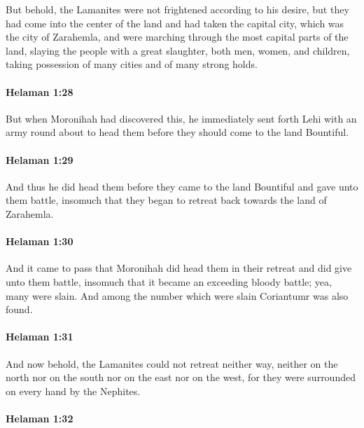 			But behold, the Lamanites were not frightened according to his desire,
			but they had come into the center of the land
			and had taken the capital city, which was the city of Zarahemla,
			and were marching through the most capital parts of the land,
			slaying the people with a great slaughter,
			both men, women, and children,
			taking possession of many cities and of many strong holds.

		\paragraph{Helaman 1:28} %
			\label{HELAMAN-1-28}

			But when Moronihah had discovered this,
			he immediately sent forth Lehi with an army round about to head them
			before they should come to the land Bountiful.

		\paragraph{Helaman 1:29} %
			\label{HELAMAN-1-29}

			And thus he did head them before they came to the land Bountiful
			and gave unto them battle,
			insomuch that they began to retreat back towards the land of Zarahemla.

		\paragraph{Helaman 1:30} %
			\label{HELAMAN-1-30}

			And it came to pass that Moronihah did head them in their retreat
			and did give unto them battle,
			insomuch that it became an exceeding bloody battle;
			yea, many were slain.
			And among the number which were slain Coriantumr was also found.

		\paragraph{Helaman 1:31} %
			\label{HELAMAN-1-31}

			And now behold, the Lamanites could not retreat neither way,
			neither on the north nor on the south nor on the east nor on the west,
			for they were surrounded on every hand by the Nephites.

		\paragraph{Helaman 1:32} %
			\label{HELAMAN-1-32}

